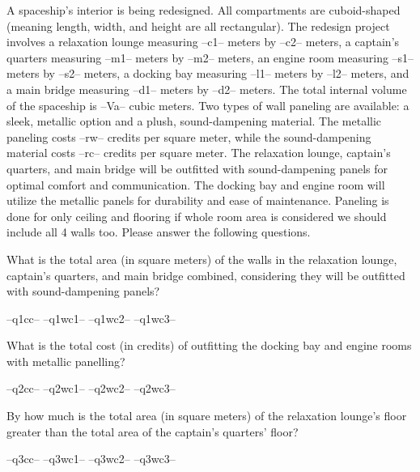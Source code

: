 \begin{tcolorbox}[colback=yellow!15!white, colframe=brown!80!white, title=Data,arc=0pt]
A spaceship's interior is being redesigned. All compartments are cuboid-shaped (meaning length, width, and height are all rectangular). The redesign project involves a relaxation lounge measuring --c1-- meters by --c2-- meters, a captain's quarters measuring --m1-- meters by --m2-- meters, an engine room measuring --s1-- meters by --s2-- meters, a docking bay measuring --l1-- meters by --l2-- meters, and a main bridge measuring --d1-- meters by --d2-- meters. The total internal volume of the spaceship is --Va-- cubic meters.  Two types of wall paneling are available: a sleek, metallic option and a plush, sound-dampening material. The metallic paneling costs --rw-- credits per square meter, while the sound-dampening material costs --rc-- credits per square meter.  The relaxation lounge, captain's quarters, and main bridge will be outfitted with sound-dampening panels for optimal comfort and communication. The docking bay and engine room will utilize the metallic panels for durability and ease of maintenance.  Paneling is done for only ceiling and flooring if whole room area is considered we should include all 4 walls too.
\tcblower
Please answer the following questions.
\end{tcolorbox}

\question  What is the total area (in square meters) of the walls in the relaxation lounge, captain's quarters, and main bridge combined, considering they will be outfitted with sound-dampening panels?

\begin{randomizechoices}
\correctchoice --q1cc-- 
\choice --q1wc1--  
\choice --q1wc2-- 
\choice --q1wc3-- 
\end{randomizechoices}

\question    What is the total cost (in credits) of outfitting the docking bay and engine rooms with metallic panelling?

\begin{randomizechoices}
\correctchoice --q2cc-- 
\choice --q2wc1--  
\choice --q2wc2-- 
\choice --q2wc3-- 
\end{randomizechoices}

\question   By how much is the total area (in square meters) of the relaxation lounge's floor greater than the total area of the captain's quarters' floor?

\begin{randomizechoices}
\correctchoice --q3cc-- 
\choice --q3wc1--  
\choice --q3wc2-- 
\choice --q3wc3-- 
\end{randomizechoices}

